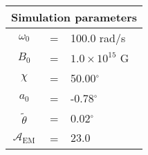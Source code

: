 \begin{tabular}{ccl}
\multicolumn{3}{c}{Simulation parameters} \\
\hline
$\omega_0$  &=& 100.0 rad/s\\
$B_0$  &=& ${1.0}{\times} 10^{15}$ G \\
$\chi$  &=& 50.00$^{\circ}$ \\
$a_0$ &=& -0.78$^{\circ}$ \\
$\tilde{\theta}$ &= & 0.02$^{\circ}$ \\
$\mathcal{A}_{\mathrm{EM}}$ &= & $23.0$
\end{tabular}